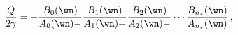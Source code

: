 \begin{equation}
{Q\over 2\gamma} = - 
{B_0(\wn)\over A_0(\wn)-}{B_1(\wn)\over A_1(\wn)-}
{B_2(\wn)\over A_2(\wn)-}\cdots {B_{n_*}(\wn)\over A_{n_*}(\wn)}\,, 
\label{eigen}
\end{equation}

